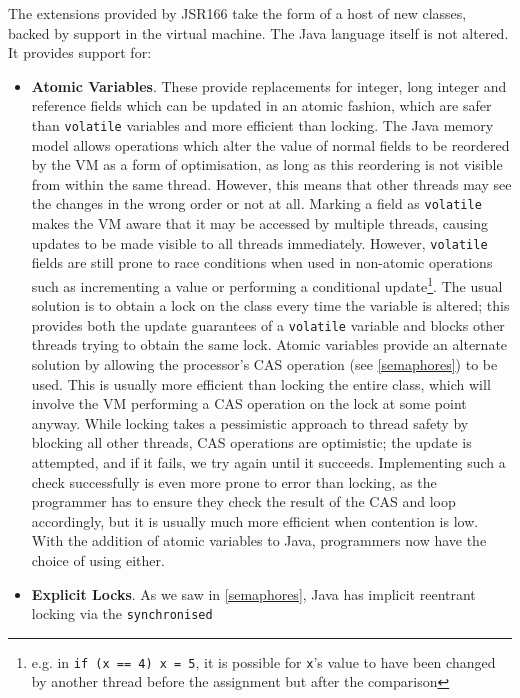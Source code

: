 The extensions provided by JSR166 take the form of a host of new
classes, backed by support in the virtual machine.  The Java language
itself is not altered.  It provides support for:

\begin{itemize}
\item \textbf{Atomic Variables}.  These provide replacements for
  integer, long integer and reference fields which can be updated in
  an atomic fashion, which are safer than \texttt{volatile} variables
  and more efficient than locking.  The Java memory model allows
  operations which alter the value of normal fields to be reordered by
  the VM as a form of optimisation, as long as this reordering is not
  visible from within the same thread.  However, this means that other
  threads may see the changes in the wrong order or not at all.
  Marking a field as \texttt{volatile} makes the VM aware that it may
  be accessed by multiple threads, causing updates to be made visible
  to all threads immediately.  However, \texttt{volatile} fields are
  still prone to race conditions when used in non-atomic operations
  such as incrementing a value or performing a conditional
  update\footnote{e.g. in \texttt{if (x == 4) x = 5}, it is possible
    for \texttt{x}'s value to have been changed by another thread
    before the assignment but after the comparison}.  The usual
  solution is to obtain a lock on the class every time the variable is
  altered; this provides both the update guarantees of a
  \texttt{volatile} variable and blocks other threads trying to obtain
  the same lock.  Atomic variables provide an alternate solution by
  allowing the processor's CAS operation (see \ref{semaphores}) to be
  used.  This is usually more efficient than locking the entire class,
  which will involve the VM performing a CAS operation on the lock at
  some point anyway.  While locking takes a pessimistic approach to
  thread safety by blocking all other threads, CAS operations are
  optimistic; the update is attempted, and if it fails, we try again
  until it succeeds.  Implementing such a check successfully is even
  more prone to error than locking, as the programmer has to ensure
  they check the result of the CAS and loop accordingly, but it is
  usually much more efficient when contention is low.  With the
  addition of atomic variables to Java, programmers now have the
  choice of using either.
  \item \textbf{Explicit Locks}.  As we saw in \ref{semaphores}, Java
    has implicit reentrant locking via the \texttt{synchronised}

\end{itemize}
